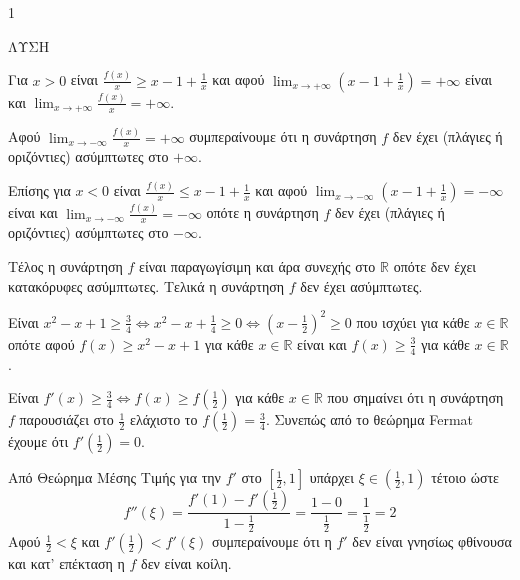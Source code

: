 \begin{ylh}{1}
    \item [Ύλη από εικόνα]
\end{ylh}
ΛΥΣΗ
\begin{alist}
    \item [$\alpha$)]
        \begin{rlist}
            \item Για $x>0$ είναι $\frac{f(x)}{x} \geq x-1+\frac{1}{x}$ και αφού $\lim_{x\to +\infty} \left(x-1+\frac{1}{x}\right) = +\infty$ είναι και $\lim_{x\to +\infty} \frac{f(x)}{x} = +\infty$.
            \item Αφού $\lim_{x\to -\infty} \frac{f(x)}{x} = +\infty$ συμπεραίνουμε ότι η συνάρτηση $f$ δεν έχει (πλάγιες ή οριζόντιες) ασύμπτωτες στο $+\infty$.

                Επίσης για $x<0$ είναι $\frac{f(x)}{x} \leq x-1+\frac{1}{x}$ και αφού $\lim_{x\to -\infty} \left(x-1+\frac{1}{x}\right) = -\infty$ είναι και $\lim_{x\to -\infty} \frac{f(x)}{x} = -\infty$ οπότε η συνάρτηση $f$ δεν έχει (πλάγιες ή οριζόντιες) ασύμπτωτες στο $-\infty$.

                Τέλος η συνάρτηση $f$ είναι παραγωγίσιμη και άρα συνεχής στο $\mathbb{R}$ οπότε δεν έχει κατακόρυφες ασύμπτωτες. Τελικά η συνάρτηση $f$ δεν έχει ασύμπτωτες.
            \item Είναι $x^2-x+1 \geq \frac{3}{4} \Leftrightarrow x^2-x+\frac{1}{4} \geq 0 \Leftrightarrow \left(x-\frac{1}{2}\right)^2 \geq 0$ που ισχύει για κάθε $x \in \mathbb{R}$ οπότε αφού $f(x) \geq x^2-x+1$ για κάθε $x \in \mathbb{R}$ είναι και $f(x) \geq \frac{3}{4}$ για κάθε $x \in \mathbb{R}$.
        \end{rlist}
    \item [$\beta$)]
        \begin{rlist}
            \item Είναι $f'(x) \geq \frac{3}{4} \Leftrightarrow f(x) \geq f\left(\frac{1}{2}\right)$ για κάθε $x \in \mathbb{R}$ που σημαίνει ότι η συνάρτηση $f$ παρουσιάζει στο $\frac{1}{2}$ ελάχιστο το $f\left(\frac{1}{2}\right) = \frac{3}{4}$. Συνεπώς από το θεώρημα Fermat έχουμε ότι $f'\left(\frac{1}{2}\right) = 0$.
            \item Από Θεώρημα Μέσης Τιμής για την $f'$ στο $\left[\frac{1}{2},1\right]$ υπάρχει $\xi \in \left(\frac{1}{2},1\right)$ τέτοιο ώστε
            \[ f''(\xi) = \frac{f'(1)-f'\left(\frac{1}{2}\right)}{1-\frac{1}{2}} = \frac{1-0}{\frac{1}{2}} = \frac{1}{\frac{1}{2}} = 2 \]
            Αφού $\frac{1}{2} < \xi$ και $f'\left(\frac{1}{2}\right) < f'(\xi)$ συμπεραίνουμε ότι η $f'$ δεν είναι γνησίως φθίνουσα και κατ' επέκταση η $f$ δεν είναι κοίλη.


\end{rlist}
\end{alist}
